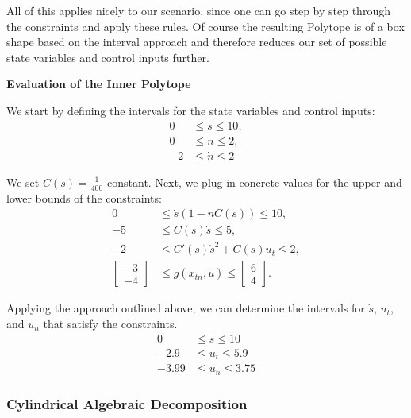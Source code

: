 All of this applies nicely to our scenario, since one can go step by step through the constraints and apply these rules.
Of course the resulting Polytope is of a box shape based on the interval approach and therefore reduces our set of possible state variables and
control inputs further.

\textbf{Evaluation of the Inner Polytope}

We start by defining the intervals for the state variables and control inputs:
\begin{align*}
	0  & \leq s \leq 10,     \\
	0  & \leq n \leq 2,      \\
	-2 & \leq \dot{n} \leq 2
\end{align*}

We set $C(s) = \frac{1}{400}$ constant.
Next, we plug in concrete values for the upper and lower bounds of the constraints:
\begin{align*}
	0               & \leq \dot{s}(1 - nC(s)) \leq 10,            \\
	-5              & \leq C(s) \dot{s} \leq 5,                   \\
	-2              & \leq C'(s) \dot{s}^2 + C(s) u_t \leq 2,     \\
	\begin{bmatrix}
		-3 \\ -4
	\end{bmatrix} & \leq g(x_{tn}, \tilde{u}) \leq \begin{bmatrix}
		                                               6 \\ 4
	                                               \end{bmatrix}.
\end{align*}

Applying the approach outlined above, we can determine the intervals for $\dot{s}$, $u_t$, and $u_n$ that satisfy the constraints.
\begin{align*}
	0     & \leq \dot{s} \leq 10 \\
	-2.9  & \leq u_t \leq 5.9    \\
	-3.99 & \leq u_n \leq 3.75
\end{align*}

\subsubsection{Cylindrical Algebraic Decomposition}

